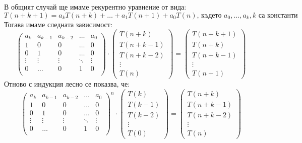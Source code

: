 \documentclass{article}
\theoremstyle{definition}
\theoremstyle{plain}
\theoremstyle{remark}
\theoremstyle{definition}
\begin{document}
В общият случай ще имаме рекурентно уравнение от вида:
\[
    T(n + k + 1) = a_k T(n + k) + \dots + a_1 T(n + 1) + a_0 T(n) \text{, където } a_0, \dots, a_k, k \text{ са константи}
\]
Тогава имаме следната зависимост:
\[
    \begin{pmatrix}
        a_k    & a_{k - 1} & a_{k - 2} & \dots  & a_0    \\
        1      & 0         & 0         & \dots  & 0      \\
        0      & 1         & 0         & \dots  & 0      \\
        \vdots & \vdots    & \vdots    & \ddots & \vdots \\
        0      & \dots     & 0         & 1      & 0      \\
    \end{pmatrix}
    \cdot
    \begin{pmatrix}
        T(n + k)     \\
        T(n + k - 1) \\
        T(n + k - 2) \\
        \vdots       \\
        T(n)
    \end{pmatrix}
    =
    \begin{pmatrix}
        T(n + k + 1) \\
        T(n + k)     \\
        T(n + k - 1) \\
        \vdots       \\
        T(n + 1)
    \end{pmatrix}
\]
Отново с индукция лесно се показва, че:
\[
    \begin{pmatrix}
        a_k    & a_{k - 1} & a_{k - 2} & \dots  & a_0    \\
        1      & 0         & 0         & \dots  & 0      \\
        0      & 1         & 0         & \dots  & 0      \\
        \vdots & \vdots    & \vdots    & \ddots & \vdots \\
        0      & \dots     & 0         & 1      & 0      \\
    \end{pmatrix}^n
    \cdot
    \begin{pmatrix}
        T(k)     \\
        T(k - 1) \\
        T(k - 2) \\
        \vdots   \\
        T(0)
    \end{pmatrix}
    =
    \begin{pmatrix}
        T(n + k)     \\
        T(n + k - 1) \\
        T(n + k - 2) \\
        \vdots       \\
        T(n)
    \end{pmatrix}
\]
\end{document}
